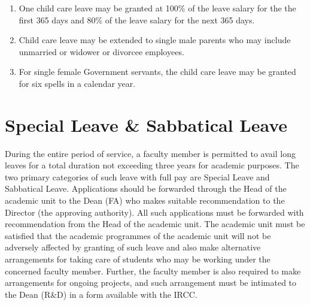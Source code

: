 \documentclass[
  10pt,
  a5paper,
  10pt,
  openany]{amsbook}
\providecommand{\tightlist}{%
  \setlength{\itemsep}{0pt}\setlength{\parskip}{0pt}}
\begin{document}
\begin{enumerate}
\def\labelenumi{\arabic{enumi}.}
\tightlist
\item
  One child care leave may be granted at 100\% of the leave salary for
  the the first 365 days and 80\% of the leave salary for the next 365
  days.
\item
  Child care leave may be extended to single male parents who may
  include unmarried or widower or divorcee employees.
\item
  For single female Government servants, the child care leave may be
  granted for six spells in a calendar year.
\end{enumerate}

\section{Special Leave \& Sabbatical
Leave}\label{special-leave-sabbatical-leave}

During the entire period of service, a faculty member is permitted to
avail long leaves for a total duration not exceeding three years for
academic purposes. The two primary categories of such leave with full
pay are Special Leave and Sabbatical Leave. Applications should be
forwarded through the Head of the academic unit to the Dean (FA) who
makes suitable recommendation to the Director (the approving authority).
All such applications must be forwarded with recommendation from the
Head of the academic unit. The academic unit must be satisfied that the
academic programmes of the academic unit will not be adversely affected
by granting of such leave and also make alternative arrangements for
taking care of students who may be working under the concerned faculty
member. Further, the faculty member is also required to make
arrangements for ongoing projects, and such arrangement must be
intimated to the Dean (R\&D) in a form available with the IRCC.
\end{document}
